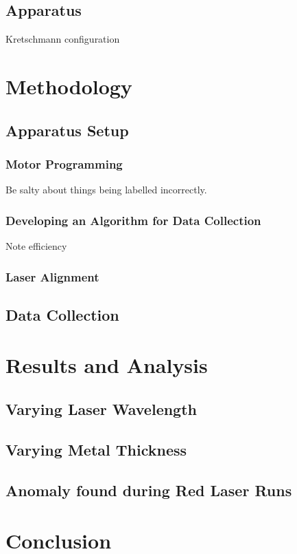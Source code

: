 \documentclass[%
reprint,
amsmath,amssymb,
aps,
]{revtex4-2}
\begin{document}
		\subsection{Apparatus}
			Kretschmann configuration
		
	 
	\section{Methodology}
		\subsection{Apparatus Setup}
			\subsubsection{Motor Programming}
				Be salty about things being labelled incorrectly.
			
			\subsubsection{Developing an Algorithm for Data Collection}
				Note efficiency
			
			\subsubsection{Laser Alignment}
			
		\subsection{Data Collection}
			\subsubsection{}
		
		
	
	\section{Results and Analysis}
		\subsection{Varying Laser Wavelength}
		
		\subsection{Varying Metal Thickness}
	
		\subsection{Anomaly found during Red Laser Runs}

	\section{Conclusion}
		
		
	\newpage
		
	\newpage
	\appendix
		
		
\end{document}
